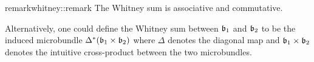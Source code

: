 \begin{mystatement}{remark}{whitney::remark} The Whitney sum is associative and commutative. \end{mystatement}

\begin{myparagraph} Alternatively, one could define the Whitney sum between $\bb_1$ and $\bb_2$ to be the induced microbundle $\ind{\Delta}(\bb_1 \cross \bb_2)$ where $\Delta$ denotes the diagonal map and $\bb_1 \cross \bb_2$ denotes the intuitive cross-product between the two microbundles. \end{myparagraph}